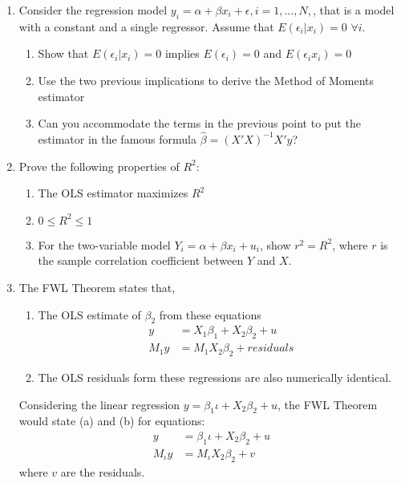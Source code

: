 \documentclass[12pt,onecolumn]{article}
\begin{document}
\begin{enumerate}
  \item Consider the regression model $y_i = \alpha +\beta x_i +\epsilon, i=1,...,N,$, that is a model with a constant and a single regressor. Assume that $E(\epsilon_i|x_i)=0$ $\forall i$.
      \begin{enumerate}
        \item Show that $E(\epsilon_i|x_i)=0$ implies  $E(\epsilon_i)=0$ and  $E(\epsilon_i x_i)=0$
        \item Use the two previous implications to derive the Method of Moments estimator
        \item Can you accommodate the terms in the previous point to put the estimator in the famous formula $\hat \beta= (X'X)^{-1}X'y$?
      \end{enumerate}
  \item Prove the following properties of $R^2$:
        \begin{enumerate}
              \item The OLS estimator maximizes $R^2$
              \item $0 \leq R^2 \leq 1$
              \item For the two-variable model $Y_i = \alpha + \beta x_i + u_i$, show $r^2 = R^2$, where $r$ is the sample correlation coefficient between $Y$ and $X$.
    \end{enumerate}
   
  \item The FWL Theorem states that,
  \begin{enumerate}
      \item The OLS estimate of $\beta_2$ from these equations
      \begin{align}
          y &= X_1\beta_1 + X_2\beta_2 + u \\
          M_1y &= M_1X_2\beta_2 + residuals
      \end{align}
      \item The OLS residuals form these regressions are also numerically identical.
  \end{enumerate}
  Considering the linear regression $y = \beta_1 \iota + X_2\beta_2 + u$, the FWL Theorem would state (a) and (b) for equations: 
  \begin{align}
      y &= \beta_1 \iota + X_2\beta_2 + u \\
      M_{\iota}y &= M_{\iota}X_2\beta_2 + v
  \end{align}
  where $v$ are the residuals. \\
  

\end{enumerate}
\end{document}
